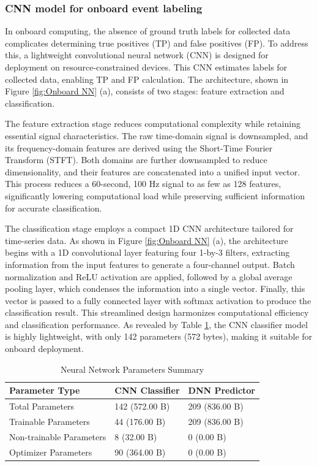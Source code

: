 \documentclass[a4paper,fleqn,numbers,sort&compress]{cas-sc}
\begin{document}
\subsubsection{CNN model for onboard event labeling}

In onboard computing, the absence of ground truth labels for collected data complicates determining true positives (TP) and false positives (FP). To address this, a lightweight convolutional neural network (CNN) is designed for deployment on resource-constrained devices. This CNN estimates labels for collected data, enabling TP and FP calculation. The architecture, shown in Figure \ref{fig:Onboard NN} (a), consists of two stages: feature extraction and classification.

The feature extraction stage reduces computational complexity while retaining essential signal characteristics. The raw time-domain signal is downsampled, and its frequency-domain features are derived using the Short-Time Fourier Transform (STFT). Both domains are further downsampled to reduce dimensionality, and their features are concatenated into a unified input vector. This process reduces a 60-second, 100 Hz signal to as few as 128 features, significantly lowering computational load while preserving sufficient information for accurate classification.

The classification stage employs a compact 1D CNN architecture tailored for time-series data. As shown in Figure \ref{fig:Onboard NN} (a), the architecture begins with a 1D convolutional layer featuring four 1-by-3 filters, extracting information from the input features to generate a four-channel output. Batch normalization and ReLU activation are applied, followed by a global average pooling layer, which condenses the information into a single vector. Finally, this vector is passed to a fully connected layer with softmax activation to produce the classification result. This streamlined design harmonizes computational efficiency and classification performance. As revealed by Table \ref{tab:NN}, the CNN classifier model is highly lightweight, with only 142 parameters (572 bytes), making it suitable for onboard deployment.

\begin{table}[h!]
    \centering
    \caption{Neural Network Parameters Summary}
    \label{tab:NN}
    \renewcommand{\arraystretch}{1.5} %
    {\selectfont %
    \small
    \begin{tabular}{lll}
        \toprule
        \textbf{Parameter Type}  & \textbf{CNN Classifier} & \textbf{DNN Predictor} \\
        \midrule
        Total Parameters         & 142 (572.00 B) & 209 (836.00 B) \\
        Trainable Parameters     & 44 (176.00 B)  & 209 (836.00 B) \\
        Non-trainable Parameters & 8 (32.00 B)    & 0   (0.00 B)   \\
        Optimizer Parameters     & 90 (364.00 B)  & 0   (0.00 B)   \\
        \bottomrule
    \end{tabular}
    } %
\end{table}
\end{document}
